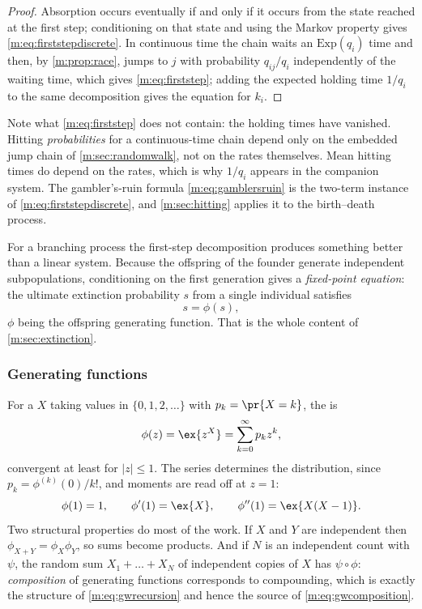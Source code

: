 \begin{proof}
Absorption occurs eventually if and only if it occurs from the state reached at the
first step; conditioning on that state and using the Markov property gives
\cref{m:eq:firststepdiscrete}. In continuous time the chain waits an
$\mathrm{Exp}(q_i)$ time and then, by \cref{m:prop:race}, jumps to $j$ with
probability $q_{ij}/q_i$ independently of the waiting time, which gives
\cref{m:eq:firststep}; adding the expected holding time $1/q_i$ to the same
decomposition gives the equation for $k_i$.
\end{proof}

Note what \cref{m:eq:firststep} does not contain: the holding times have vanished.
Hitting \emph{probabilities} for a continuous-time chain depend only on the
embedded jump chain of \cref{m:sec:randomwalk}, not on the rates themselves. Mean
hitting times do depend on the rates, which is why $1/q_i$ appears in the companion
system. The gambler's-ruin formula \cref{m:eq:gamblersruin} is the two-term instance
of \cref{m:eq:firststepdiscrete}, and \cref{m:sec:hitting} applies it to the
birth--death process.

For a branching process the first-step decomposition produces something better than
a linear system. Because the offspring of the founder generate independent
subpopulations, conditioning on the first generation gives a \emph{fixed-point
equation}: the ultimate extinction probability $s$ from a single individual
satisfies
\begin{equation}
\label{m:eq:extinctionfixedpoint}
s = \phi(s) ,
\end{equation}
$\phi$ being the offspring generating function. That is the whole content of
\cref{m:sec:extinction}.

\subsubsection{Generating functions}
\label{m:sec:pgfmethod}

For a \rv{} $X$ taking values in $\{0,1,2,\dots\}$ with $p_k=\pr{X=k}$, the
\pgf{} is
\begin{equation}
\label{m:eq:pgfdef}
\phi(z) = \ex{z^X} = \sum_{k=0}^{\infty}p_kz^k ,
\end{equation}
convergent at least for $|z|\le1$. The series determines the distribution, since
$p_k=\phi^{(k)}(0)/k!$, and moments are read off at $z=1$:
\begin{equation}
\label{m:eq:pgfmoments}
\phi(1)=1,
\qquad
\phi'(1) = \ex{X},
\qquad
\phi''(1) = \ex{X(X-1)} .
\end{equation}
Two structural properties do most of the work. If $X$ and $Y$ are independent then
$\phi_{X+Y}=\phi_X\phi_Y$, so sums become products. And if $N$ is an independent
count with \pgf{} $\psi$, the random sum $X_1+\dots+X_N$ of independent copies of
$X$ has \pgf{} $\psi\circ\phi$: \emph{composition} of generating functions
corresponds to compounding, which is exactly the structure of
\cref{m:eq:gwrecursion} and hence the source of \cref{m:eq:gwcomposition}.

